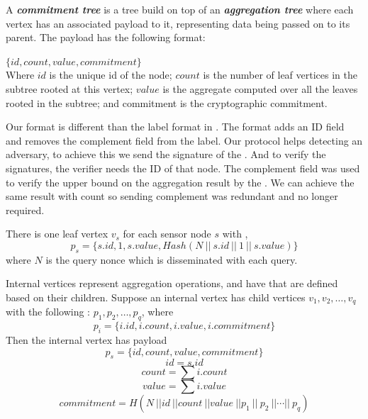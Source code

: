 	\begin{definition}\cite{chan2006secure}\label{def:ct}
		A \textbf{\textit{commitment tree}} is a tree build on top of an \textbf{\textit{aggregation tree}} where each vertex has an associated payload to it, representing data being passed on to its parent. The payload has the following format:

		$\{id, count, value, commitment\}$\\
		Where $id$ is the unique id of the node; $count$ is the number of leaf vertices in the subtree rooted at this vertex; $value$ is the aggregate computed over all the leaves rooted in the subtree; and commitment is the cryptographic commitment.

	\end{definition}

	Our \payload format is different than the label format in \cite{chan2006secure}.
	The \payload format adds an ID field and removes the complement field from the label. 
	Our protocol helps detecting an adversary, to achieve this we send the signature of the \payload. 
	And to verify the signatures, the verifier needs the ID of that node.
	The complement field was used to verify the upper bound on the aggregation result by the \q.
	We can achieve the same result with count so sending complement was redundant and no longer required.     

	There is one leaf vertex $v_{s}$ for each sensor node $s$ with \payload ,
	\begin{equation}
		p_{s} = \{ s.id, 1,s.value, Hash( N\ ||\  s.id\ ||\  1\  ||\  s.value ) \} 
	\end{equation}
	where $N$ is the query nonce which is disseminated with each query.

	Internal vertices represent aggregation operations, and have \payloads that are defined based on their children. Suppose an internal vertex has child vertices $v_{1}, v_{2},\dotsc, v_{q}$ with the following \payloads: $p_{1}, p_{2},\dotsc, p_{q}$, where
	\begin{equation}
		p_{i} = \{ i.id, i.count, i.value, i.commitment\} 
	\end{equation}
	Then the internal vertex has payload 
	\begin{equation}
		p_{s} = \{ id, count, value, commitment \} 
	\end{equation}
	\begin{equation}
		id = s.id 
	\end{equation}	
	\begin{equation}
		count = \sum{i.count}		
	\end{equation}
	\begin{equation}
		value = \sum{i.value}		
	\end{equation}
	\begin{equation}
		commitment = H (N\ ||  id\ ||  count\ ||  value\ || p_{1}\ ||\ p_{2}\ || \dotsb ||\ p_{q})		
	\end{equation}

